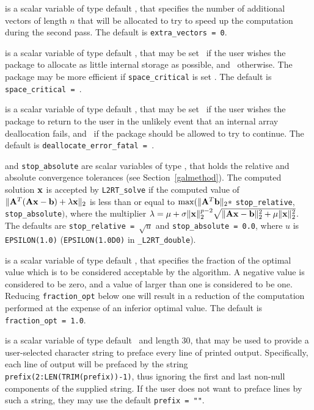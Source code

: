 \documentclass{galahad}
\newcommand{\packagename}{L2\-RT}
\newcommand{\fullpackagename}{\libraryname\_\packagename}
\begin{document}
\begin{description}
 is a scalar variable of type default \integer,
that specifies the number of additional vectors of length $n$
that will be allocated to try to speed up the computation during the
second pass.
The default is {\tt extra\_vectors = 0}.

 is a scalar variable of type default \logical, that
may be set \true\ if the user wishes the package to allocate as little
internal storage as possible, and \false\ otherwise. The package may
be more efficient if {\tt space\_critical} is set \false.
The default is {\tt space\_critical = \false}.

 is a scalar variable of type default \logical,
that may be set \true\ if the user wishes the package to return to the user
in the unlikely event that an internal array deallocation fails,
and \false\ if the package should be allowed to try to continue.
The default is {\tt deallocate\_error\_fatal = \false}.

 and {\tt stop\_absolute} are scalar variables of type
\realdp, that holds the
relative and absolute convergence tolerances (see Section~\ref{galmethod}).
The computed solution ${\mathbf{x}}$ is accepted by {\tt \packagename\_solve}
if the computed value of
$\|{\mathbf{A}}^T ( {\mathbf{A}} {\mathbf{x}} - {\mathbf{b}} ) + \lambda {\mathbf{x}}\|_2$
is less than or equal
to $\max (\| {\mathbf{A}}^T {\mathbf{b}} \|_2 \ast$ {\tt stop\_relative},
{\tt stop\_absolute}$)$, where the multiplier
$\lambda = \mu + \sigma \|{\mathbf{x}}\|_2^{p-2}
 \sqrt{\| {\mathbf{A}} {\mathbf{x}} - {\mathbf{b}} \|_2^2 + \mu \|{\mathbf{x}}\|_2^2}$.
The defaults are {\tt stop\_\-relative = $\sqrt{u}$} and
{\tt stop\_absolute = 0.0},
where $u$ is {\tt EPSILON(1.0)} ({\tt EPSILON(1.0D0)} in
{\tt \fullpackagename\_double}).

 is a scalar variable of type default
\realdp, that specifies the fraction
of the optimal value which is to be considered acceptable by the algorithm.
A negative value is considered to be zero, and a value of larger than one
is considered to be one. Reducing {\tt fraction\_opt} below one will result
in a reduction of the computation performed at the expense of an inferior
optimal value.
The default is {\tt fraction\_opt = 1.0}.

 is a scalar variable of type default \character\
and length 30, that may be used to provide a user-selected
character string to preface every line of printed output.
Specifically, each line of output will be prefaced by the string
{\tt prefix(2:LEN(TRIM(prefix))-1)},
thus ignoring the first and last non-null components of the
supplied string. If the user does not want to preface lines by such
a string, they may use the default {\tt prefix = ""}.

\end{description}
\end{document}
